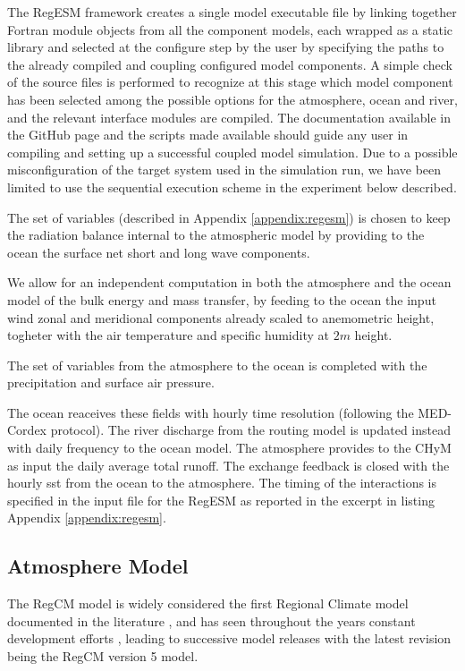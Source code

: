 \documentclass[journal abbreviation, manuscript]{copernicus}
\begin{document}
The RegESM framework creates a single model executable file by
linking together Fortran module objects from all the component models, each
wrapped as a static library and selected at the configure step by the user
by specifying the paths to the already compiled and coupling configured
model components. A simple check of the source files is performed to recognize
at this stage which model component has been selected among the possible
options for the atmosphere, ocean and river, and the relevant interface
modules are compiled. The documentation available in the GitHub page and
the scripts made available should guide any user in compiling and setting
up a successful coupled model simulation. Due to a possible misconfiguration
of the target system used in the simulation run, we have been limited to use
the sequential execution scheme in the experiment below described.

The set of variables (described in Appendix \ref{appendix:regesm}) is chosen to
keep the radiation balance internal to the atmospheric model by providing to
the ocean the surface net short and long wave components.

We allow for an independent computation in both the atmosphere and
the ocean model of the bulk energy and mass transfer, by feeding to the ocean
the input wind zonal and meridional components already scaled to anemometric
height, togheter with the air temperature and specific humidity at $2m$ height.

The set of variables from the atmosphere to the ocean is completed with the
precipitation and surface air pressure.

The ocean reaceives these fields with hourly time resolution (following the
MED-Cordex protocol). The river discharge from the routing model is updated
instead with daily frequency to the ocean model. The atmosphere provides
to the CHyM as input the daily average total runoff. The exchange feedback
is closed with the hourly sst from the ocean to the atmosphere.
The timing of the interactions is specified in the input file for the RegESM
as reported in the excerpt in listing Appendix \ref{appendix:regesm}.

\subsection{Atmosphere Model}

The RegCM model is widely considered the first Regional Climate model
documented in the literature \citep{giorgi-1989}, and has seen throughout
the years constant development efforts
\citep{giorgi-1993,giorgi-1999,pal-2007,giorgi-2012,coppola-2021,giorgi-2023},
leading to successive model releases with the latest revision being the
RegCM version 5 model.
\end{document}
